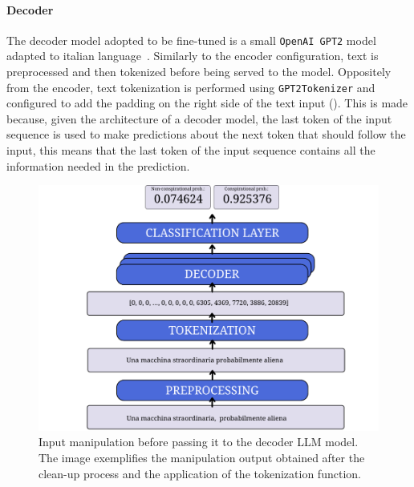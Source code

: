 \documentclass[11pt]{article}
\begin{document}
\paragraph{Decoder}

The decoder model adopted to be fine-tuned is a small \texttt{OpenAI GPT2} model adapted to italian language~\cite{de-vries-nissim-2021-good}.
%
Similarly to the encoder configuration,
text is preprocessed and then tokenized before being served to the model.
%
Oppositely from the encoder,
text tokenization is performed using \texttt{GPT2Tokenizer}
and configured to add the padding on the right side of the text input ().
%
This is made because, given the architecture of a decoder model,
the last token of the input sequence is used to make predictions about the next token that should follow the input,
this means that the last token of the input sequence contains all the information needed in the prediction.
%
\begin{figure}
  \centering
  \includegraphics[width=\linewidth]{figures/decoder.pdf}
  \caption{
    Input manipulation before passing it to the decoder LLM model.
    The image exemplifies the manipulation output obtained after the clean-up process and the application of the tokenization function.
  }
  \label{fig:preprocessing-and-tokenization-decoder}
\end{figure}
\end{document}
